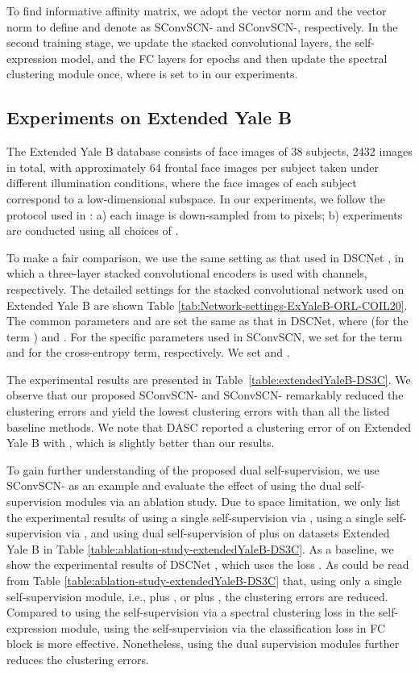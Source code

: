 \documentclass[10pt,twocolumn,letterpaper]{article}
\def\ie{i.e.}
\def\ie{i.e.}
\begin{document}
To find informative affinity matrix, we adopt the vector  norm and the vector  norm to define  and denote as SConvSCN- and SConvSCN-, respectively. In the second training stage, we update the stacked convolutional layers, the self-expression model, and the FC layers for  epochs and then update the spectral clustering module once, where  is set to  in our experiments. 


\subsection{Experiments on Extended Yale B}


The Extended Yale B database \cite{Georghiades:TPAMI01} consists of face images of 38 subjects, 2432 images in total, with approximately 64 frontal face images per subject taken under different illumination conditions, where the face images of each subject correspond to a low-dimensional subspace. In our experiments, we follow the protocol used in \cite{Ji:NIPS17}: a) each image is down-sampled from  to  pixels; b) experiments are conducted using all choices of . 


To make a fair comparison, we use the same setting as that used in DSCNet \cite{Ji:NIPS17}, in which a three-layer stacked convolutional encoders is used with  channels, respectively. The detailed settings for the stacked convolutional network used on Extended Yale B are shown Table \ref{tab:Network-settings-ExYaleB-ORL-COIL20}.
The common parameters  and  are set the same as that in DSCNet, where  (for the term ) and . For the specific parameters used in SConvSCN, we set  for the term  and  for the cross-entropy term, respectively.  We set  and . 


The experimental results are presented in Table~\ref{table:extendedYaleB-DS3C}. We observe that our proposed SConvSCN- and SConvSCN- remarkably reduced the clustering errors and yield the lowest clustering errors with  than all the listed baseline methods. We note that DASC \cite{Zhou:CVPR18} reported a clustering error of  on Extended Yale B with , which is slightly better than our results.


To gain further understanding of the proposed dual self-supervision, we use SConvSCN- as an example and evaluate the effect of using the dual self-supervision modules via an ablation study. Due to space limitation, we only list the experimental results of using a single self-supervision via , using a single self-supervision via , and using dual self-supervision of  plus  on datasets Extended Yale B in Table \ref{table:ablation-study-extendedYaleB-DS3C}. As a baseline, we show the experimental results of DSCNet \cite{Ji:NIPS17}, which uses the loss . As could be read from Table \ref{table:ablation-study-extendedYaleB-DS3C} that, using only a single self-supervision module, \ie,  plus , or  plus , the clustering errors are reduced. Compared to using the self-supervision via a spectral clustering loss  in the self-expression module, using the self-supervision via the classification loss  in FC block is more effective. Nonetheless, using the dual supervision modules further reduces the clustering errors.
\end{document}

